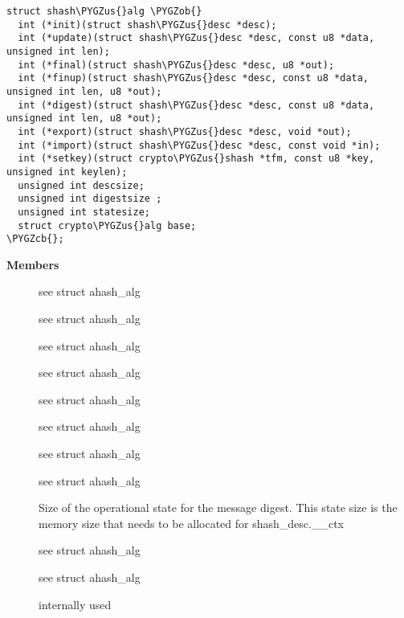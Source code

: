 \documentclass[a4paper,8pt,english]{sphinxmanual}
\def\PYGZus{\char`\_}
\def\PYGZob{\char`\{}
\def\PYGZcb{\char`\}}
\begin{document}
\begin{Verbatim}[commandchars=\\\{\}]
struct shash\PYGZus{}alg \PYGZob{}
  int (*init)(struct shash\PYGZus{}desc *desc);
  int (*update)(struct shash\PYGZus{}desc *desc, const u8 *data, unsigned int len);
  int (*final)(struct shash\PYGZus{}desc *desc, u8 *out);
  int (*finup)(struct shash\PYGZus{}desc *desc, const u8 *data, unsigned int len, u8 *out);
  int (*digest)(struct shash\PYGZus{}desc *desc, const u8 *data, unsigned int len, u8 *out);
  int (*export)(struct shash\PYGZus{}desc *desc, void *out);
  int (*import)(struct shash\PYGZus{}desc *desc, const void *in);
  int (*setkey)(struct crypto\PYGZus{}shash *tfm, const u8 *key, unsigned int keylen);
  unsigned int descsize;
  unsigned int digestsize ;
  unsigned int statesize;
  struct crypto\PYGZus{}alg base;
\PYGZcb{};
\end{Verbatim}

\textbf{Members}
\begin{description}
\item[{}] \leavevmode
see struct ahash\_alg

\item[{}] \leavevmode
see struct ahash\_alg

\item[{}] \leavevmode
see struct ahash\_alg

\item[{}] \leavevmode
see struct ahash\_alg

\item[{}] \leavevmode
see struct ahash\_alg

\item[{}] \leavevmode
see struct ahash\_alg

\item[{}] \leavevmode
see struct ahash\_alg

\item[{}] \leavevmode
see struct ahash\_alg

\item[{}] \leavevmode
Size of the operational state for the message digest. This state
size is the memory size that needs to be allocated for
shash\_desc.\_\_ctx

\item[{}] \leavevmode
see struct ahash\_alg

\item[{}] \leavevmode
see struct ahash\_alg

\item[{}] \leavevmode
internally used

\end{description}
\end{document}
